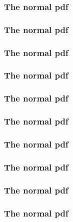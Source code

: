 \begin{frame}[fragile]\frametitle{The normal pdf}

\end{frame}
\begin{frame}[fragile]\frametitle{The normal pdf}


\end{frame}
\begin{frame}[fragile]\frametitle{The normal pdf}


\end{frame}
\begin{frame}[fragile]\frametitle{The normal pdf}


\end{frame}
\begin{frame}[fragile]\frametitle{The normal pdf}


\end{frame}
\begin{frame}[fragile]\frametitle{The normal pdf}


\end{frame}
\begin{frame}[fragile]\frametitle{The normal pdf}


\end{frame}
\begin{frame}[fragile]\frametitle{The normal pdf}

\end{frame}
\begin{frame}[fragile]\frametitle{The normal pdf}


\end{frame}
\begin{frame}[fragile]\frametitle{The normal pdf}


\end{frame}

